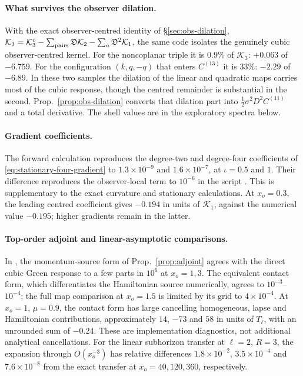 \paragraph{What survives the observer dilation.} With the exact observer-centred identity of
\S\ref{sec:obs-dilation}, $\mathcal K_3=\mathcal K^c_3-\sum_{\rm pairs}\mathfrak D\mathcal K_2
-\sum_a\mathfrak D^2\mathcal K_1$, the same code isolates the genuinely cubic observer-centred kernel.
For the noncoplanar triple it is $0.9\%$ of $\mathcal K_3$: $+0.063$ of $-6.759$. For the
configuration $(k,q,-q)$ that enters $C^{(13)}$ it is $33\%$: $-2.29$ of $-6.89$. In these two
samples the dilation of the linear and quadratic maps carries most of the cubic response,
though the centred remainder is substantial in the second. Prop.~\ref{prop:obs-dilation} converts that dilation
part into $\frac12\sigma^2D^2C^{(11)}$ and a total derivative. The shell values are in
the exploratory spectra below.

\paragraph{Gradient coefficients.}
The forward calculation reproduces the degree-two and degree-four coefficients of
\eqref{eq:stationary-four-gradient} to $1.3\times10^{-9}$ and $1.6\times10^{-7}$,
at $\iota=0.5$ and $1$. Their difference reproduces the observer-local term to $10^{-6}$
in the script .
This is supplementary to the exact curvature and stationary calculations. At $x_o=0.3$, the leading centred coefficient gives
$-0.194$ in units of $\mathcal K_1$, against the numerical value $-0.195$; higher gradients
remain in the latter.

\paragraph{Top-order adjoint and linear-asymptotic comparisons.}
In , the momentum-source form of
Prop.~\ref{prop:adjoint} agrees with the direct cubic Green response to a few parts in
$10^6$ at $x_o=1,3$. The equivalent contact form, which differentiates the Hamiltonian
source numerically, agrees to $10^{-3}$--$10^{-4}$; the full map comparison at $x_o=1.5$
is limited by its grid to $4\times10^{-4}$. At $x_o=1$, $\mu=0.9$, the contact form has
large cancelling homogeneous, lapse and Hamiltonian contributions, approximately
$14$, $-73$ and $58$ in units of $T_\ell$, with an unrounded sum of $-0.24$.
These are implementation diagnostics, not additional analytical cancellations.
For the linear subhorizon transfer at $\ell=2$, $R=3$, the expansion through $O(x_o^{-3})$
has relative differences $1.8\times10^{-2}$, $3.5\times10^{-4}$ and $7.6\times10^{-8}$
from the exact transfer at $x_o=40,120,360$, respectively.

